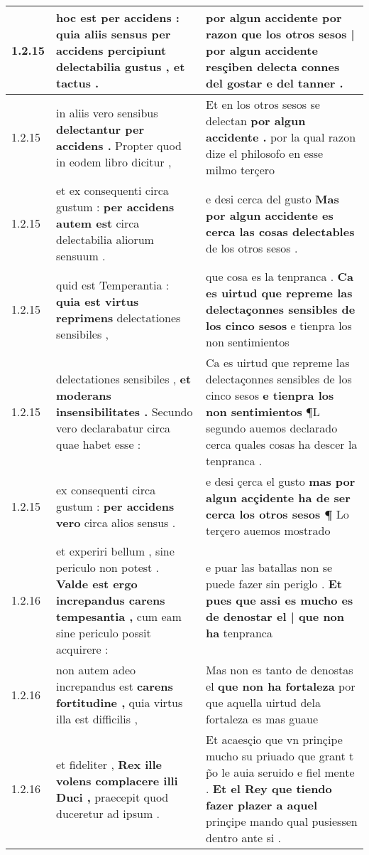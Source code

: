 \begin{tabular}{|p{1cm}|p{6.5cm}|p{6.5cm}|}
1.2.15 & hoc est per accidens : \textbf{ quia aliis sensus per accidens percipiunt } delectabilia gustus , et tactus . & por algun accidente \textbf{ por razon que los otros sesos | por algun accidente resçiben } delecta connes del gostar e del tanner . \\\hline
1.2.15 & in aliis vero sensibus \textbf{ delectantur per accidens . } Propter quod in eodem libro dicitur , & Et en los otros sesos se delectan \textbf{ por algun accidente . } por la qual razon dize el philosofo en esse milmo terçero \\\hline
1.2.15 & et ex consequenti circa gustum : \textbf{ per accidens autem est } circa delectabilia aliorum sensuum . & e desi cerca del gusto \textbf{ Mas por algun accidente es cerca las cosas delectables } de los otros sesos . \\\hline
1.2.15 & quid est Temperantia : \textbf{ quia est virtus reprimens } delectationes sensibiles , & que cosa es la tenpranca . \textbf{ Ca es uirtud que repreme las delectaçonnes sensibles de los cinco sesos } e tienpra los non sentimientos \\\hline
1.2.15 & delectationes sensibiles , \textbf{ et moderans insensibilitates . } Secundo vero declarabatur circa quae habet esse : & Ca es uirtud que repreme las delectaçonnes sensibles de los cinco sesos \textbf{ e tienpra los non sentimientos } ¶L segundo auemos declarado cerca quales cosas ha descer la tenpranca . \\\hline
1.2.15 & ex consequenti circa gustum : \textbf{ per accidens vero } circa alios sensus . & e desi çerca el gusto \textbf{ mas por algun acçidente ha de ser cerca los otros sesos ¶ } Lo terçero auemos mostrado \\\hline
1.2.16 & et experiri bellum , sine periculo non potest . \textbf{ Valde est ergo increpandus carens tempesantia , } cum eam sine periculo possit acquirere : & e puar las batallas non se puede fazer sin periglo . \textbf{ Et pues que assi es mucho es de denostar el | que non ha } tenpranca \\\hline
1.2.16 & non autem adeo increpandus est \textbf{ carens fortitudine , } quia virtus illa est difficilis , & Mas non es tanto de denostas el \textbf{ que non ha fortaleza } por que aquella uirtud dela fortaleza es mas guaue \\\hline
1.2.16 & et fideliter , \textbf{ Rex ille volens complacere illi Duci , } praecepit quod duceretur ad ipsum . & Et acaesçio que vn prinçipe mucho su priuado que grant t p̃o le auia seruido e fiel mente . \textbf{ Et el Rey que tiendo fazer plazer a aquel } prinçipe mando qual pusiessen dentro ante si . \\\hline

\end{tabular}
